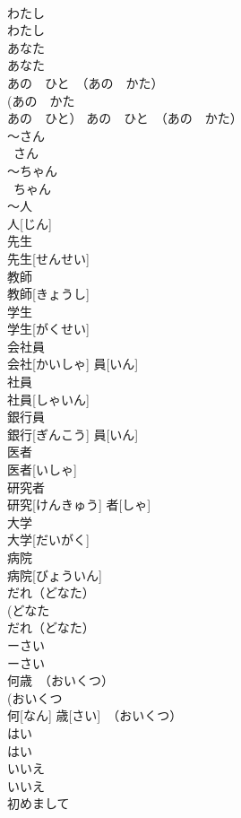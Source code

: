 \documentclass[8pt]{extreport}
\begin{document}
\begin{CJK}{UTF8}{min}
\\	わたし	
\\	わたし	
\\	あなた	
\\	あなた	
\\	あの　ひと　（あの　かた）	
\\	(あの　かた　
\\	あの　ひと）	あの　ひと　（あの　かた）	
\\	～さん	
\\	~さん	
\\	～ちゃん	
\\	~ちゃん	
\\	～人	
\\	人[じん]	
\\	先生	
\\	先生[せんせい]	
\\	教師	
\\	教師[きょうし]	
\\	学生	
\\	学生[がくせい]	
\\	会社員	
\\	会社[かいしゃ] 員[いん]	
\\	社員	
\\	社員[しゃいん]	
\\	銀行員	
\\	銀行[ぎんこう] 員[いん]	
\\	医者	
\\	医者[いしゃ]	
\\	研究者	
\\	研究[けんきゅう] 者[しゃ]	
\\	大学	
\\	大学[だいがく]	
\\	病院	
\\	病院[びょういん]	
\\	だれ（どなた）	
\\	(どなた 
\\	だれ（どなた）	
\\	ーさい	
\\	ーさい	
\\	何歳　（おいくつ）	
\\	(おいくつ 
\\	何[なん] 歳[さい]　（おいくつ）	
\\	はい	
\\	はい	
\\	いいえ	
\\	いいえ	
\\	初めまして	

\end{CJK}
\end{document}
